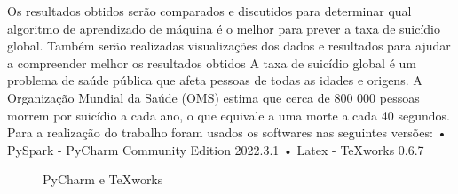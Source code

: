 \documentclass{article}
\begin{document}
Os resultados obtidos serão comparados e discutidos para determinar qual algoritmo de aprendizado de máquina é o melhor para prever a taxa de suicídio global. Também serão realizadas visualizações dos dados e resultados para ajudar a compreender melhor os resultados obtidos
A taxa de suicídio global é um problema de saúde pública que afeta pessoas de todas as idades e origens. A Organização Mundial da Saúde (OMS) estima que cerca de 800 000 pessoas morrem por suicídio a cada ano, o que equivale a uma morte a cada 40 segundos.
\medskip
\newline
Para a realização do trabalho foram usados os softwares nas seguintes versões: 
\medskip
\newline
•    PySpark - PyCharm Community  Edition 2022.3.1
\newline
•    Latex - TeXworks 0.6.7
\begin{figure}[h]
	\centering
	\caption{PyCharm e TeXworks}
	\label{fig:FigurasAB}
\end{figure}
\end{document}
